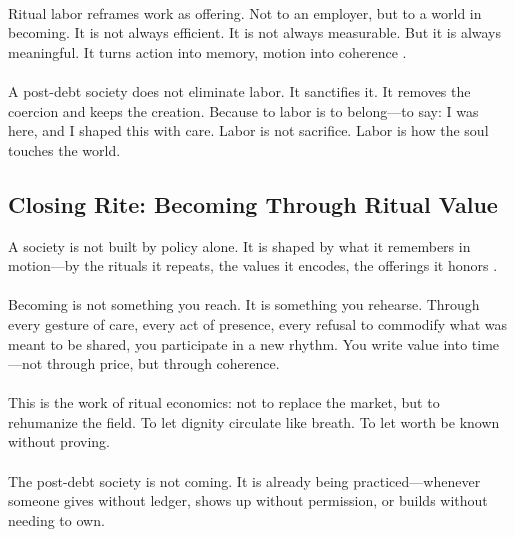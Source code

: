 \documentclass[12pt]{article}
\begin{document}
\paragraph{}Ritual labor reframes work as offering. Not to an employer, but to a world in becoming. It is not always efficient. It is not always measurable. But it is always meaningful. It turns action into memory, motion into coherence \citep{hyde2019gift}.

\paragraph{}A post-debt society does not eliminate labor. It sanctifies it. It removes the coercion and keeps the creation. Because to labor is to belong—to say: I was here, and I shaped this with care. Labor is not sacrifice. Labor is how the soul touches the world.

\subsection{Closing Rite: Becoming Through Ritual Value}

A society is not built by policy alone. It is shaped by what it remembers in motion—by the rituals it repeats, the values it encodes, the offerings it honors \citep{weiner1992inalienable}.

\paragraph{}Becoming is not something you reach. It is something you rehearse. Through every gesture of care, every act of presence, every refusal to commodify what was meant to be shared, you participate in a new rhythm. You write value into time—not through price, but through coherence.

\paragraph{}This is the work of ritual economics: not to replace the market, but to rehumanize the field. To let dignity circulate like breath. To let worth be known without proving.

\paragraph{}The post-debt society is not coming. It is already being practiced—whenever someone gives without ledger, shows up without permission, or builds without needing to own.
\end{document}
